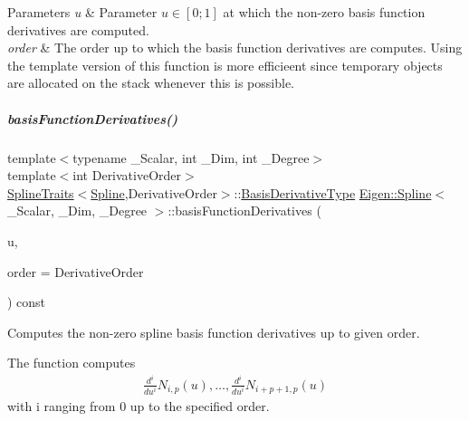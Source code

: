 \begin{DoxyParams}{Parameters}
{\em u} & Parameter $u \in [0;1]$ at which the non-\/zero basis function derivatives are computed. \\
\hline
{\em order} & The order up to which the basis function derivatives are computes. Using the template version of this function is more efficieent since temporary objects are allocated on the stack whenever this is possible. \\
\hline
\end{DoxyParams}
\mbox{\label{group___splines___module_acd36d8b5a4f57eb1d7f27989ac6d54ac}} 
\subparagraph{\texorpdfstring{basis\+Function\+Derivatives()}{basisFunctionDerivatives()}\hspace{0.1cm}{\footnotesize\ttfamily [4/4]}}
{\footnotesize\ttfamily template$<$typename \+\_\+\+Scalar, int \+\_\+\+Dim, int \+\_\+\+Degree$>$ \\
template$<$int Derivative\+Order$>$ \\
\hyperlink{struct_eigen_1_1_spline_traits}{Spline\+Traits}$<$\hyperlink{group___splines___module_class_eigen_1_1_spline}{Spline},Derivative\+Order$>$\+::\hyperlink{group___splines___module_a9db0b0108353660cd03524f2e67d6b3c}{Basis\+Derivative\+Type} \hyperlink{group___splines___module_class_eigen_1_1_spline}{Eigen\+::\+Spline}$<$ \+\_\+\+Scalar, \+\_\+\+Dim, \+\_\+\+Degree $>$\+::basis\+Function\+Derivatives (\begin{DoxyParamCaption}\item[{\hyperlink{group___splines___module_a8cafd78b564825c76fbb3419653d9742}{Scalar}}]{u,  }\item[{Dense\+Index}]{order = {\ttfamily DerivativeOrder} }\end{DoxyParamCaption}) const}



Computes the non-\/zero spline basis function derivatives up to given order. 

The function computes \begin{align*} \frac{d^i}{du^i} N_{i,p}(u), \hdots, \frac{d^i}{du^i} N_{i+p+1,p}(u) \end{align*} with i ranging from 0 up to the specified order.


